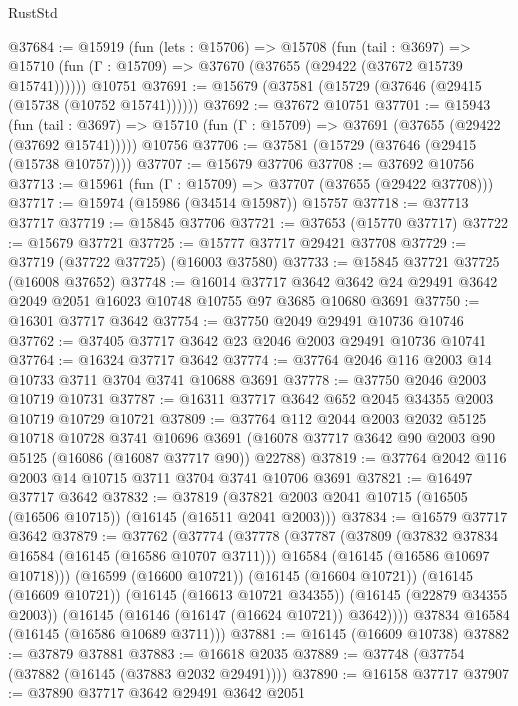 \begin{lexlean}{RustStd}
\begin{coremodule}
@37684 := @15919
    (fun (lets : @15706) =>
    @15708
      (fun (tail : @3697) =>
      @15710 (fun (Γ : @15709) => @37670 (@37655 (@29422 (@37672 @15739 @15741))))))
    @10751
@37691 := @15679 (@37581 (@15729 (@37646 (@29415 (@15738 (@10752 @15741))))))
@37692 := @37672 @10751
@37701 := @15943
    (fun (tail : @3697) => @15710 (fun (Γ : @15709) => @37691 (@37655 (@29422 (@37692 @15741)))))
    @10756
@37706 := @37581 (@15729 (@37646 (@29415 (@15738 @10757))))
@37707 := @15679 @37706
@37708 := @37692 @10756
@37713 := @15961 (fun (Γ : @15709) => @37707 (@37655 (@29422 @37708)))
@37717 := @15974 (@15986 (@34514 @15987)) @15757
@37718 := @37713 @37717
@37719 := @15845 @37706
@37721 := @37653 (@15770 @37717)
@37722 := @15679 @37721
@37725 := @15777 @37717 @29421 @37708
@37729 := @37719 (@37722 @37725) (@16003 @37580)
@37733 := @15845 @37721 @37725 (@16008 @37652)
@37748 := @16014
    @37717
    @3642
    @3642
    @24
    @29491
    @3642
    @2049
    @2051
    @16023
    @10748
    @10755
    @97
    @3685
    @10680
    @3691
@37750 := @16301 @37717 @3642
@37754 := @37750 @2049 @29491 @10736 @10746
@37762 := @37405 @37717 @3642 @23 @2046 @2003 @29491 @10736 @10741
@37764 := @16324 @37717 @3642
@37774 := @37764 @2046 @116 @2003 @14 @10733 @3711 @3704 @3741 @10688 @3691
@37778 := @37750 @2046 @2003 @10719 @10731
@37787 := @16311 @37717 @3642 @652 @2045 @34355 @2003 @10719 @10729 @10721
@37809 := @37764
    @112
    @2044
    @2003
    @2032
    @5125
    @10718
    @10728
    @3741
    @10696
    @3691
    (@16078 @37717 @3642 @90 @2003 @90 @5125 (@16086 (@16087 @37717 @90)) @22788)
@37819 := @37764 @2042 @116 @2003 @14 @10715 @3711 @3704 @3741 @10706 @3691
@37821 := @16497 @37717 @3642
@37832 := @37819 (@37821 @2003 @2041 @10715 (@16505 (@16506 @10715)) (@16145 (@16511 @2041 @2003)))
@37834 := @16579 @37717 @3642
@37879 := @37762
    (@37774
      (@37778
        (@37787
          (@37809
            (@37832 @37834 @16584 (@16145 (@16586 @10707 @3711)))
            @16584
            (@16145 (@16586 @10697 @10718)))
          (@16599 (@16600 @10721))
          (@16145 (@16604 @10721))
          (@16145 (@16609 @10721))
          (@16145 (@16613 @10721 @34355))
          (@16145 (@22879 @34355 @2003))
          (@16145 (@16146 (@16147 (@16624 @10721)) @3642))))
      @37834
      @16584
      (@16145 (@16586 @10689 @3711)))
@37881 := @16145 (@16609 @10738)
@37882 := @37879 @37881
@37883 := @16618 @2035
@37889 := @37748 (@37754 (@37882 (@16145 (@37883 @2032 @29491))))
@37890 := @16158 @37717
@37907 := @37890
    @37717
    @3642
    @29491
    @3642
    @2051

\end{coremodule}
\end{lexlean}
